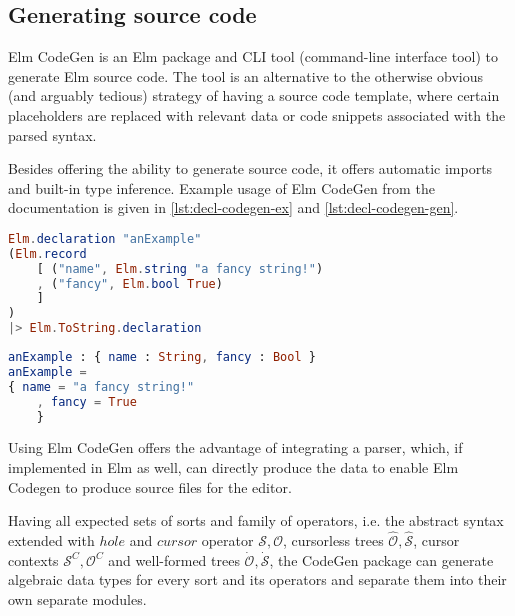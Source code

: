 \documentclass[sigplan,review]{acmart}
\begin{document}
\subsection{Generating source code}
Elm CodeGen\cite{elm-codegen-package} is an Elm package and
CLI tool (command-line interface tool) to generate Elm source code.
The tool is an alternative to the otherwise obvious (and arguably tedious)
strategy of having a source code template, where certain placeholders are
replaced with relevant data or code snippets associated with the parsed syntax.

Besides offering the ability to generate source code, it offers automatic
imports and built-in type inference. Example usage of Elm CodeGen from
the documentation\cite{elm-codegen-package} is given in \cref{lst:decl-codegen-ex} and \cref{lst:decl-codegen-gen}.

\begin{lstlisting}[language=elm,caption={An Elm CodeGen declaration passed to the ToString function},label={lst:decl-codegen-ex}]
Elm.declaration "anExample"
(Elm.record
    [ ("name", Elm.string "a fancy string!")
    , ("fancy", Elm.bool True)
    ]
)
|> Elm.ToString.declaration
\end{lstlisting}

\begin{lstlisting}[language=elm,caption={Result after running code generation via the Elm-CodeGen CLI},label={lst:decl-codegen-gen}]
anExample : { name : String, fancy : Bool }
anExample =
{ name = "a fancy string!"
    , fancy = True
    }
\end{lstlisting}

Using Elm CodeGen offers the advantage of integrating a parser, which,
if implemented in Elm as well, can directly produce the data to enable
Elm Codegen to produce source files for the editor.

Having all expected sets of sorts and family of operators,
i.e. the abstract syntax extended with $hole$ and $cursor$ operator $\mathcal{S},
  \mathcal{O}$, cursorless trees $\hat{\mathcal{O}},\hat{\mathcal{S}}$,
cursor contexts $\mathcal{S}^C,\mathcal{O}^C$ and
well-formed trees $\dot{\mathcal{O}},\dot{\mathcal{S}}$,
the CodeGen package can generate algebraic data types for every sort and its operators
and separate them into their own separate modules.
\end{document}
